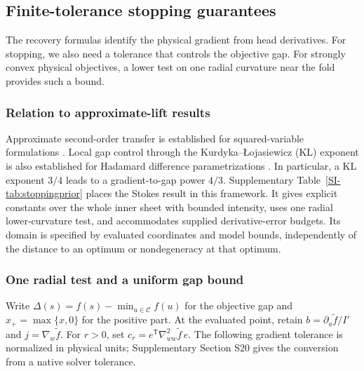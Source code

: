 \documentclass[10pt,a4paper]{article}
\begin{document}
\subsection{Finite-tolerance stopping guarantees}
\label{sec:stoppingguarantees}
The recovery formulas identify the physical gradient from head derivatives. For stopping, we also need a tolerance that controls the objective gap. For strongly convex physical objectives, a lower test on one radial curvature near the fold provides such a bound.

\subsubsection{Relation to approximate-lift results}
Approximate second-order transfer is established for squared-variable formulations \cite[Thm.~3.6 and Cor.~3.7]{dingwright}. Local gap control through the Kurdyka--\L{}ojasiewicz (KL) exponent is also established for Hadamard difference parametrizations \cite[Thm.~3.11 and Rem.~3.12]{ouyang}. In particular, a KL exponent $3/4$ leads to a gradient-to-gap power $4/3$. Supplementary Table~\ref{SI-tab:stoppingprior} places the Stokes result in this framework. It gives explicit constants over the whole inner sheet with bounded intensity, uses one radial lower-curvature test, and accommodates supplied derivative-error budgets. Its domain is specified by evaluated coordinates and model bounds, independently of the distance to an optimum or nondegeneracy at that optimum.



\subsubsection{One radial test and a uniform gap bound}
Write $\Delta(s)=f(s)-\min_{u\in\mathcal C}f(u)$ for the objective gap and $x_+=\max\{x,0\}$ for the positive part. At the evaluated point, retain $b=\partial_a\widetilde f/I'$ and $j=\nabla_w\widetilde f$. For $r>0$, set $c_r=e^{\mathsf T}\nabla^2_{ww}\widetilde f\,e$. The following gradient tolerance is normalized in physical units; Supplementary Section S20 gives the conversion from a native solver tolerance.
\end{document}
